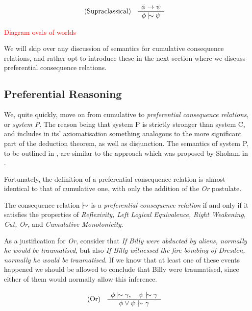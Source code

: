 \begin{align}
	\label{postulate:supraclassical}\inferLeft{Supraclassical}{\phi \rightarrow \psi}{\phi \twiddle \psi}
\end{align}

\textcolor{red}{Diagram ovals of worlds}

We will skip over any discussion of semantics for cumulative consequence relations, and rather opt to introduce these in
the next section where we discuss preferential consequence relations.

\subsection{Preferential Reasoning}
\label{subsection:system-P} 

We, quite quickly, move on from cumulative to \textit{preferential consequence relations}, or \textit{system P}. The
reason being that system P is strictly stronger than system C, and includes in its' axiomatisation something analogous
to the more significant part of the deduction theorem, as well as disjunction. The semantics of system P, to be outlined
in , are similar to the approach which was proposed by Shoham in
\cite{shohamSemanticApproach}.

Fortunately, the definition of a preferential consequence relation is almost identical to that of cumulative one, with
only the addition of the \textit{Or} postulate.

\begin{definition}
	\label{definition:preferential-relation}

	The consequence relation $\twiddle$ is a \emph{preferential consequence relation} if and only if it satisfies the properties
	of \emph{Reflexivity, Left Logical Equivalence, Right Weakening, Cut, Or,} and \emph{Cumulative Monotonicity}.
\end{definition}

As a justification for \textit{Or}, consider that \textit{If Billy were abducted by aliens, normally he would be traumatised},
but also \textit{If Billy witnessed the fire-bombing of Dresden, normally he would be traumatised}. If we know that at
least one of these events happened we should be allowed to conclude that Billy were traumatised, since either of them would
normally allow this inference.

\begin{align}
	\inferLeft{Or}{\phi \twiddle \gamma, \quad \psi \twiddle \gamma}{\phi \lor \psi \twiddle \gamma}
\end{align}

